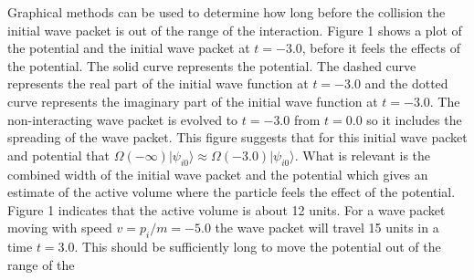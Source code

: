 \documentclass[aps,prc,reprint,noshowpacs,groupedaddress,onecolumn]{revtex4}
\begin{document}
Graphical methods can be used to determine how long before the collision
the initial wave packet is out of the range of the interaction.
Figure 1 shows a plot of the potential and the initial wave packet at
$t=-3.0$, before it feels the effects of the potential.  The
solid curve represents the potential.  The dashed curve represents the
real part of the initial wave function at $t=-3.0$ and the dotted curve
represents the imaginary part of the initial wave function at $t=-3.0$.
The non-interacting wave packet is evolved to $t=-3.0$ from $t=0.0$ so it
includes the spreading of the wave packet.
This figure suggests that for this initial wave packet and potential that
$\Omega (-\infty) \vert \psi_{i0} \rangle \approx
\Omega (-3.0) \vert \psi_{i0} \rangle $.
%
%
%
%
%
What is relevant
is the combined width of the initial wave packet and the potential
which gives an estimate of the active volume
where the particle feels the effect of the potential. 
Figure 1 indicates that the active volume is about 12
units.  For a wave packet moving with speed $v=p_i/m=-5.0$ the wave
packet will travel 15 units in a time $t=3.0$.  This should be
sufficiently long to move the potential out of the range of the
\end{document}

